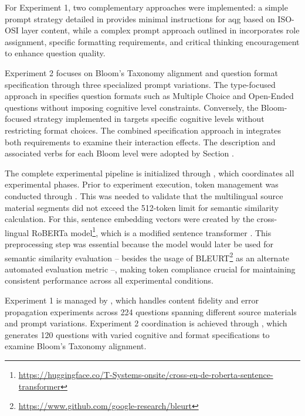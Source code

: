 For Experiment 1, two complementary approaches were implemented: a simple prompt strategy detailed in  provides minimal instructions for \ac{aqg} based on ISO-OSI layer content, while a complex prompt approach outlined in  incorporates role assignment, specific formatting requirements, and critical thinking encouragement to enhance question quality.

\pagebreak

Experiment 2 focuses on Bloom's Taxonomy alignment and question format specification through three specialized prompt variations. The type-focused approach in  specifies question formats such as Multiple Choice and Open-Ended questions without imposing cognitive level constraints. Conversely, the Bloom-focused strategy implemented in  targets specific cognitive levels without restricting format choices. The combined specification approach in  integrates both requirements to examine their interaction effects. The description and associated verbs for each Bloom level were adopted by Section .

The complete experimental pipeline is initialized through , which coordinates all experimental phases. Prior to experiment execution, token management was conducted through . This was needed to validate that the multilingual source material segments did not exceed the 512-token limit for semantic similarity calculation. For this, sentence embedding vectors were created by the cross-lingual RoBERTa model\footnote{\url{https://huggingface.co/T-Systems-onsite/cross-en-de-roberta-sentence-transformer}}, which is a modified sentence transformer \cite{reimers_sentence-bert_2019}. This preprocessing step was essential because the model would later be used for semantic similarity evaluation -- besides the usage of BLEURT\footnote{\url{https://www.github.com/google-research/bleurt}} as an alternate automated evaluation metric --, making token compliance crucial for maintaining consistent performance across all experimental conditions.

Experiment 1 is managed by , which handles content fidelity and error propagation experiments across 224 questions spanning different source materials and prompt variations. Experiment 2 coordination is achieved through , which generates 120 questions with varied cognitive and format specifications to examine Bloom's Taxonomy alignment.

